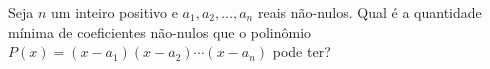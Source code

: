Seja $n$ um inteiro positivo e $a_1, a_2, \dots, a_n$ reais não-nulos. Qual é a quantidade mínima de coeficientes não-nulos que o polinômio $P(x) = (x-a_1)(x-a_2)\cdots(x-a_n)$ pode ter?
